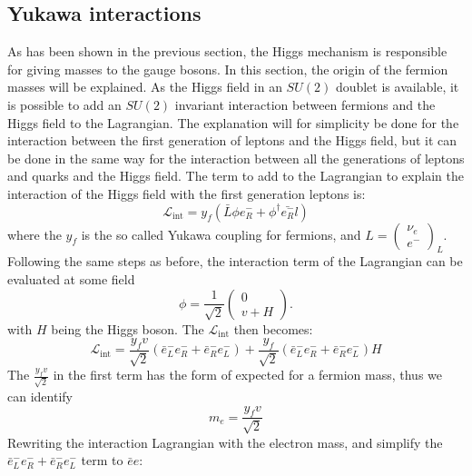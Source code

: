 \subsection*{Yukawa interactions}\label{sec:yukawa}
\noindent\justify
As has been shown in the previous section, the Higgs mechanism is responsible for giving masses to the gauge bosons. In this section, the origin of the fermion masses will be explained.
As the Higgs field in an $SU(2)$ doublet is available, it is possible to add an $SU(2)$ invariant interaction between fermions and the Higgs field to the Lagrangian. 
The explanation will for simplicity be done for the interaction between the first generation of leptons and the Higgs field, but it can be done in the same way for the interaction between all the generations of leptons and quarks and the Higgs field. 
The term to add to the Lagrangian to explain the interaction of the Higgs field with the first generation leptons is:
\begin{equation}
\mathcal{L}_{\mathrm{int}}=y_{f}(\bar{L}\phi e^{-}_{R}+\phi^{\dagger}\bar{e^{-}_{R}}l)
\label{eq:yf}
\end{equation}
where the $y_{f}$ is the so called Yukawa coupling for fermions, and $L=\begin{pmatrix}\nu_{e}  \\ e^{-}\end{pmatrix}_{L}$. 
Following the same steps as before, the interaction term of the Lagrangian can be evaluated at some field  
\begin{equation}
\phi=\frac{1}{\sqrt{2}}\begin{pmatrix} 0  \\ v+H\end{pmatrix}. 
\end{equation}
with $H$ being the Higgs boson. 
The $\mathcal{L}_{\mathrm{int}}$ then becomes:
\begin{equation}
\mathcal{L}_{\mathrm{int}}=\frac{y_{f}v}{\sqrt{2}}(\bar{e}^{-}_{L}e^{-}_{R}+\bar{e}_{R}^{-}e^{-}_{L})+ \frac{y_{f}}{\sqrt{2}}(\bar{e}^{-}_{L} e^{-}_{R}+\bar{e}_{R}^{-}e^{-}_{L})H
\label{eq:boom}
\end{equation}
The $\frac{y_{f}v}{\sqrt{2}}$ in the first term has the form of expected for a fermion mass, thus we can identify 
\begin{equation}
m_{e}=\frac{y_{f}v}{\sqrt{2}}
\end{equation}
Rewriting the interaction Lagrangian with the electron mass, and simplify the $\bar{e}^{-}_{L}e^{-}_{R}+\bar{e}_{R}^{-}e^{-}_{L}$ term to $\bar{e}e$:
